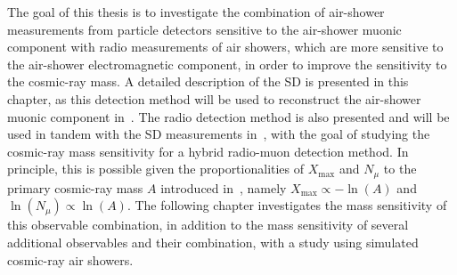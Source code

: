 The goal of this thesis is to investigate the combination of air-shower measurements from particle detectors sensitive to the air-shower muonic component with radio measurements of air showers, which are more sensitive to the air-shower electromagnetic component, in order to improve the sensitivity to the cosmic-ray mass.
A detailed description of the SD is presented in this chapter, as this detection method will be used to reconstruct the air-shower muonic component in~.
The radio detection method is also presented and will be used in tandem with the SD measurements in~, with the goal of studying the cosmic-ray mass sensitivity for a hybrid radio-muon detection method.
In principle, this is possible given the proportionalities of $X_{\text{max}}$ and $N_{\mu}$ to the primary cosmic-ray mass $A$ introduced in~, namely $X_{\text{max}} \propto -\ln\left(A\right)$ and $\ln\left(N_{\mu}\right) \propto \ln\left(A\right)$.
The following chapter investigates the mass sensitivity of this observable combination, in addition to the mass sensitivity of several additional observables and their combination, with a study using simulated cosmic-ray air showers.
